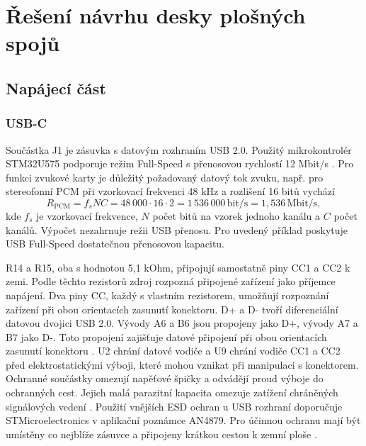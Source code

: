 \chapter{Řešení návrhu desky plošných spojů}

\section{Napájecí část}

\subsection{USB-C}

Součástka J1 je zásuvka s datovým rozhraním USB 2.0. Použitý mikrokontrolér STM32U575 podporuje režim Full-Speed s přenosovou rychlostí 12 Mbit/s \cite[tab.~5 a~7]{st_an4879}. Pro funkci zvukové karty je důležitý požadovaný datový tok zvuku, např. pro stereofonní PCM při vzorkovací frekvenci 48 kHz a rozlišení 16 bitů vychází
\begin{equation}
    R_{\mathrm{PCM}} = f_s N C
    = 48\,000 \cdot 16 \cdot 2
    = 1\,536\,000\,\mathrm{bit/s}
    = 1{,}536\,\mathrm{Mbit/s},
    \label{eq:usb_audio_datovy_tok}
\end{equation}
kde $f_s$ je vzorkovací frekvence, $N$ počet bitů
na vzorek jednoho kanálu a $C$ počet kanálů. Výpočet nezahrnuje režii USB přenosu. Pro uvedený příklad poskytuje USB Full-Speed dostatečnou přenosovou kapacitu.

R14 a R15, oba s hodnotou 5,1 kOhm, připojují samostatně piny CC1 a CC2 k zemi. Podle těchto rezistorů zdroj rozpozná připojené zařízení jako příjemce napájení. Dva piny CC, každý s vlastním rezistorem, umožňují rozpoznání zařízení při obou orientacích zasunutí konektoru. D+ a D- tvoří diferenciální datovou dvojici USB 2.0. Vývody A6 a B6 jsou propojeny jako D+, vývody A7 a B7 jako D-. Toto propojení zajišťuje datové připojení při obou orientacích zasunutí konektoru \cite{espressif_usb_c}. U2 chrání datové vodiče a U9 chrání vodiče CC1 a CC2 před elektrostatickými výboji, které mohou vznikat při manipulaci s konektorem. Ochranné součástky omezují napěťové špičky a odvádějí proud výboje do ochranných cest. Jejich malá parazitní kapacita omezuje zatížení chráněných signálových vedení \cite{datasheet_usblc6_2,datasheet_tpd2e2u06}. Použití vnějších ESD ochran u USB rozhraní doporučuje STMicroelectronics v aplikační poznámce AN4879. Pro účinnou ochranu mají být umístěny co nejblíže zásuvce a připojeny krátkou cestou k zemní ploše \cite{st_an4879}.



